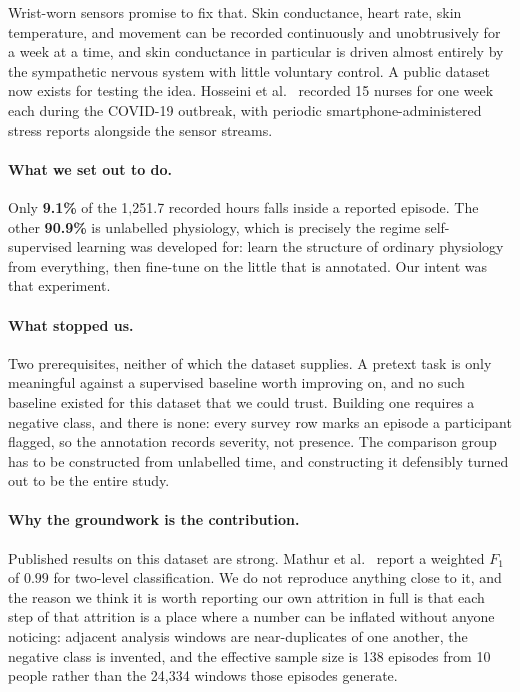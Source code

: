 Wrist-worn sensors promise to fix that. Skin conductance, heart rate, skin
temperature, and movement can be recorded continuously and unobtrusively for a
week at a time, and skin conductance in particular is driven almost entirely by
the sympathetic nervous system with little voluntary control. A public dataset
now exists for testing the idea. Hosseini et al.\ \cite{hosseini2022} recorded
15 nurses for one week each during the COVID-19 outbreak, with periodic
smartphone-administered stress reports alongside the sensor streams.

\paragraph{What we set out to do.} Only \textbf{9.1\%} of the 1{,}251.7 recorded
hours falls inside a reported episode. The other \textbf{90.9\%} is unlabelled
physiology, which is precisely the regime self-supervised learning was
developed for: learn the structure of ordinary physiology from everything, then
fine-tune on the little that is annotated. Our intent was that experiment.

\paragraph{What stopped us.} Two prerequisites, neither of which the dataset
supplies. A pretext task is only meaningful against a supervised baseline worth
improving on, and no such baseline existed for this dataset that we could
trust. Building one requires a negative class, and there is none: every survey
row marks an episode a participant flagged, so the annotation records severity,
not presence. The comparison group has to be constructed from unlabelled time,
and constructing it defensibly turned out to be the entire study.

\paragraph{Why the groundwork is the contribution.} Published results on this
dataset are strong. Mathur et al.\ \cite{mathur2024} report a weighted $F_1$ of
$0.99$ for two-level classification. We do not reproduce anything close to it,
and the reason we think it is worth reporting our own attrition in full is that
each step of that attrition is a place where a number can be inflated without
anyone noticing: adjacent analysis windows are near-duplicates of one another,
the negative class is invented, and the effective sample size is 138 episodes
from 10 people rather than the 24{,}334 windows those episodes generate.

